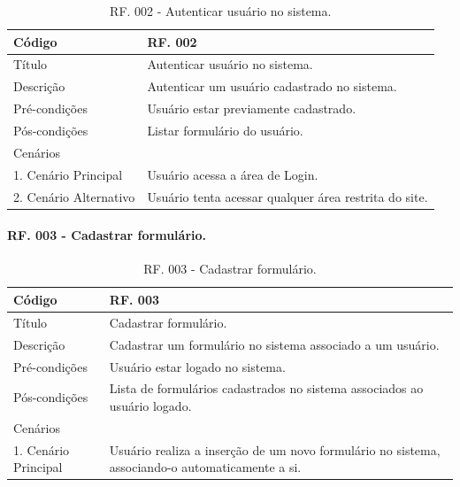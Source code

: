 \documentclass[11pt]{article}
\begin{document}
      \begin{table}[h]
        \begin{center}
          \begin{tabular}{ | p{5cm} | p{10cm} | }
            \hline
            Código\cellcolor{gray} & RF. 002\cellcolor{gray} \\
            \hline
            Título & Autenticar usuário no sistema. \\
            \hline
            Descrição & Autenticar um usuário cadastrado no sistema. \\
            \hline
            Pré-condições & Usuário estar previamente cadastrado. \\
            \hline
            Pós-condições & Listar formulário do usuário. \\
            \hline
            Cenários &   \\
            \hline
            1.  Cenário Principal & Usuário acessa a área de Login. \\
            \hline
            2.  Cenário Alternativo & Usuário tenta acessar qualquer área restrita do site. \\
            \hline
          \end{tabular}
          \caption{RF. 002 - Autenticar usuário no sistema.}
        \end{center}
      \end{table}
      
      \paragraph{RF. 003 - Cadastrar formulário.} \hspace{10pt}

      \begin{table}[h]
        \begin{center}
          \begin{tabular}{ | p{5cm} | p{10cm} | }
            \hline
            Código\cellcolor{gray} & RF. 003\cellcolor{gray} \\
            \hline
            Título & Cadastrar formulário. \\
            \hline
            Descrição & Cadastrar um formulário no sistema associado a um usuário. \\
            \hline
            Pré-condições & Usuário estar logado no sistema. \\
            \hline
            Pós-condições & Lista de formulários cadastrados no sistema associados ao usuário logado. \\
            \hline
            Cenários &   \\
            \hline
            1.  Cenário Principal & Usuário realiza a inserção de um novo formulário no sistema, associando-o automaticamente a si. \\
            \hline
          \end{tabular}
          \caption{RF. 003 - Cadastrar formulário.}
        \end{center}
      \end{table}
\end{document}
